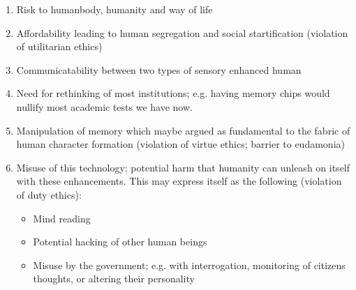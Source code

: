 \begin{enumerate}
    \item Risk to humanbody, humanity and way of life
    \item Affordability leading to human segregation and social startification (violation of utilitarian ethics)
    \item Communicatability between two types of sensory enhanced human
    \item Need for rethinking of most institutions; e.g. having memory chips would nullify most academic tests we have now.
    \item Manipulation of memory which maybe argued as fundamental to the fabric of human character formation (violation of virtue ethics; barrier to eudamonia)
    \item Misuse of this technology; potential harm that humanity can unleash on itself with these enhancements. This may express itself as the following (violation of duty ethics):
        \begin{itemize}
            \item Mind reading
            \item Potential hacking of other human beings
            \item Misuse by the government; e.g. with interrogation, monitoring of citizens thoughts, or altering their personality
        \end{itemize}
\end{enumerate}